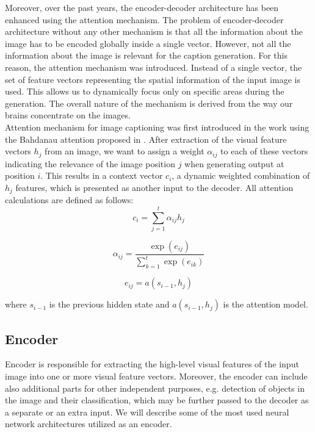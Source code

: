 Moreover, over the past years, the encoder-decoder architecture has been enhanced using the attention mechanism. The problem of encoder-decoder architecture without any other mechanism is that all the information about the image has to be encoded globally inside a single vector. However, not all the information about the image is relevant for the caption generation. For this reason, the attention mechanism was introduced. Instead of a single vector, the set of feature vectors representing the spatial information of the input image is used. This allows us to dynamically focus only on specific areas during the generation. The overall nature of the mechanism is derived from the way our brains concentrate on the images.\\

Attention mechanism for image captioning was first introduced in the \citet{xu2015show} work using the Bahdanau attention proposed in \citet{bahdanau2014neural}. After extraction of the visual feature vectors $h_j$ from an image, we want to assign a weight $\alpha_{ij}$ to each of these vectors indicating the relevance of the image position $j$ when generating output at position $i$. This results in a context vector $c_i$, a dynamic weighted combination of $h_j$ features, which is presented as another input to the decoder. All attention calculations are defined as follows:
\begin{equation}\label{eq01:AttContext}
	c_i = \sum_{j=1}^{t} \alpha_{ij} h_j
\end{equation}

\begin{equation}\label{eq01:AttWeights}
	\alpha_{ij} = \frac{\exp(e_{ij})}{\sum_{k=1}^{t} \exp(e_{ik})}
\end{equation}

\begin{equation}\label{eq01:AttFeedForwardNetwork}
	e_{ij} = a(s_{i-1}, h_j)
\end{equation}

where $s_{i-1}$ is the previous hidden state and $a(s_{i-1}, h_j)$ is the attention model.

\subsection{Encoder}
Encoder is responsible for extracting the high-level visual features of the input image into one or more visual feature vectors. Moreover, the encoder can include also additional parts for other independent purposes, e.g. detection of objects in the image and their classification, which may be further passed to the decoder as a separate or an extra input. We will describe some of the most used neural network architectures utilized as an encoder.

